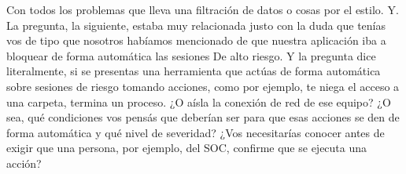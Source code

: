\begin{description}[leftmargin=0cm, labelsep=0.5cm]
    \item[\textbf{MUNTAABSKI FEDERICO:}] Con todos los problemas que lleva una filtración de datos o cosas por el estilo. Y. La pregunta, la siguiente, estaba muy relacionada justo con la duda que tenías vos de tipo que nosotros habíamos mencionado de que nuestra aplicación iba a bloquear de forma automática las sesiones De alto riesgo. Y la pregunta dice literalmente, si se presentas una herramienta que actúas de forma automática sobre sesiones de riesgo tomando acciones, como por ejemplo, te niega el acceso a una carpeta, termina un proceso. ¿O aísla la conexión de red de ese equipo? ¿O sea, qué condiciones vos pensás que deberían ser para que esas acciones se den de forma automática y qué nivel de severidad? ¿Vos necesitarías conocer antes de exigir que una persona, por ejemplo, del SOC, confirme que se ejecuta una acción?


\end{description}

